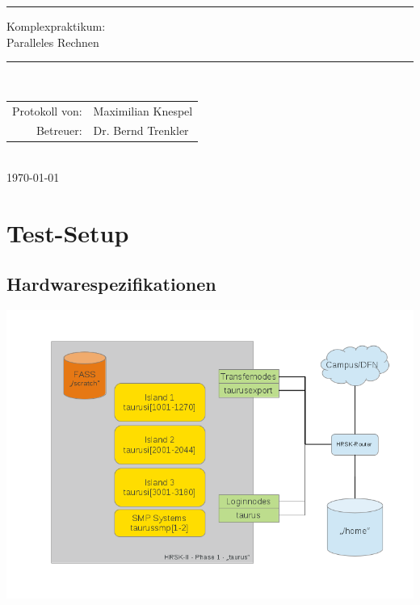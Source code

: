 \documentclass[12pt,a4paper]{article}
\begin{document}
\begin{titlepage}
\begin{center}
\rule{\textwidth}{3px}
\Huge{
Komplexpraktikum:\\
Paralleles Rechnen}\\[-12pt]
\rule{\textwidth}{3px}\\[3cm]

\vfill

\large
\begin{tabular}{rl}
	Protokoll von: & Maximilian Knespel\\
	Betreuer: & Dr. Bernd Trenkler
\end{tabular}\\[3cm]
{\large \today}
\end{center}
\end{titlepage}

\newpage

\tableofcontents
\newpage


\section{Test-Setup}


\subsection{Hardwarespezifikationen}

\begin{center}
	\centering
	\captionsetup{type=figure}
	\begin{minipage}{\linewidth}
		\includegraphics[width=\linewidth]{../systemlayout}
	\end{minipage}
	\label{fig:tauruslayout}
\end{center}
\end{document}
